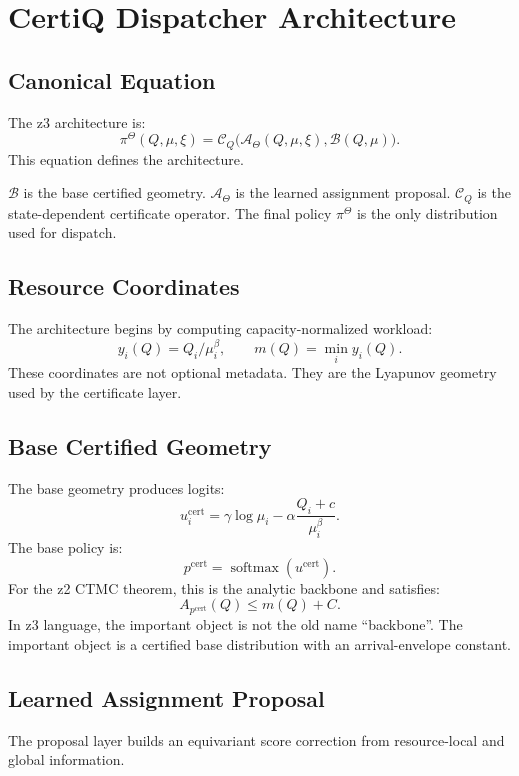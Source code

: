 \documentclass[a4paper,11pt]{article}
\theoremstyle{definition}
\begin{document}
\section{CertiQ Dispatcher Architecture}

\subsection{Canonical Equation}

The z3 architecture is:
\[
\pi^\Theta(Q,\mu,\xi)
=
\mathcal C_Q\bigl(
\mathcal A_\Theta(Q,\mu,\xi),
\mathcal B(Q,\mu)
\bigr).
\]
This equation defines the architecture.

\(\mathcal B\) is the base certified geometry. \(\mathcal A_\Theta\) is the
learned assignment proposal. \(\mathcal C_Q\) is the state-dependent
certificate operator. The final policy \(\pi^\Theta\) is the only distribution
used for dispatch.

\subsection{Resource Coordinates}

The architecture begins by computing capacity-normalized workload:
\[
y_i(Q)=Q_i/\mu_i^\beta,
\qquad
m(Q)=\min_i y_i(Q).
\]
These coordinates are not optional metadata. They are the Lyapunov geometry
used by the certificate layer.

\subsection{Base Certified Geometry}

The base geometry produces logits:
\[
u_i^{\mathrm{cert}}
=
\gamma\log\mu_i
-
\alpha\frac{Q_i+c}{\mu_i^\beta}.
\]
The base policy is:
\[
p^{\mathrm{cert}}
=
\operatorname{softmax}(u^{\mathrm{cert}}).
\]
For the z2 CTMC theorem, this is the analytic backbone and satisfies:
\[
A_{p^{\mathrm{cert}}}(Q)\le m(Q)+C.
\]
In z3 language, the important object is not the old name ``backbone''. The
important object is a certified base distribution with an arrival-envelope
constant.

\subsection{Learned Assignment Proposal}

The proposal layer builds an equivariant score correction from resource-local
and global information.
\end{document}
